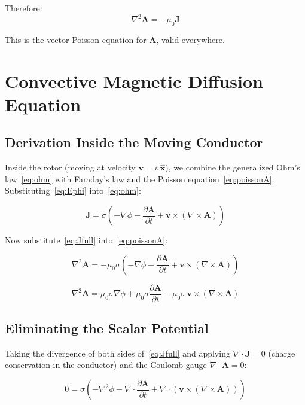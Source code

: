 \documentclass[12pt, a4paper]{article}
\theoremstyle{plain}
\theoremstyle{definition}
\newcommand{\vA}{\mathbf{A}}
\newcommand{\vJ}{\mathbf{J}}
\newcommand{\vv}{\mathbf{v}}
\newcommand{\xhat}{\hat{\mathbf{x}}}
\newcommand{\sig}{\sigma}
\newcommand{\muZ}{\mu_0}
\newcommand{\Der}[2]{\frac{\partial #1}{\partial #2}}
\begin{document}
Therefore:
\begin{equation}
  \nabla^2 \vA = -\muZ \vJ
  \label{eq:poissonA}
\end{equation}

This is the vector Poisson equation for $\vA$, valid everywhere.

\section{Convective Magnetic Diffusion Equation}
\label{sec:cmde}

\subsection{Derivation Inside the Moving Conductor}

Inside the rotor (moving at velocity $\vv = v\,\xhat$), we combine the generalized
Ohm's law~\eqref{eq:ohm} with Faraday's law and the Poisson
equation~\eqref{eq:poissonA}. Substituting~\eqref{eq:Ephi} into~\eqref{eq:ohm}:

\begin{equation}
  \vJ = \sig\left(-\nabla\phi - \Der{\vA}{t} + \vv \times (\nabla \times \vA)\right)
  \label{eq:Jfull}
\end{equation}

Now substitute~\eqref{eq:Jfull} into~\eqref{eq:poissonA}:

\begin{equation}
  \nabla^2 \vA = -\muZ \sig\left(-\nabla\phi - \Der{\vA}{t} + \vv \times (\nabla \times \vA)\right)
\end{equation}

\begin{equation}
  \nabla^2 \vA = \muZ \sig \nabla\phi
               + \muZ \sig \Der{\vA}{t}
               - \muZ \sig \,\vv \times (\nabla \times \vA)
  \label{eq:Afull}
\end{equation}

\subsection{Eliminating the Scalar Potential}

Taking the divergence of both sides of~\eqref{eq:Jfull} and applying $\nabla \cdot \vJ = 0$
(charge conservation in the conductor) and the Coulomb gauge $\nabla \cdot \vA = 0$:

\begin{equation}
  0 = \sig\left(-\nabla^2\phi - \nabla \cdot \Der{\vA}{t}
      + \nabla \cdot (\vv \times (\nabla \times \vA))\right)
\end{equation}
\end{document}
